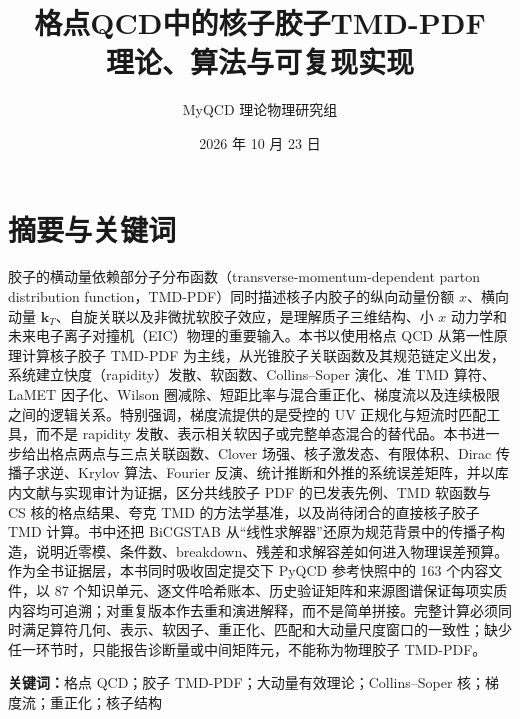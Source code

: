 \documentclass[UTF8,12pt,a4paper,twoside,openany]{ctexbook}
\title{\heiti 格点QCD中的核子胶子TMD-PDF\\[0.2em]\Large 理论、算法与可复现实现}
\author{MyQCD 理论物理研究组}
\date{2026 年 10 月 23 日}
\newcommand{\kT}{\boldsymbol k_T}
\begin{document}
\frontmatter
\maketitle

\chapter*{摘要与关键词}

\begin{tcolorbox}[
  enhanced,
  breakable,
  colback=white,
  colframe=qcdnavy!46!black,
  colbacktitle=qcdnavy!90!black,
  coltitle=white,
  title={摘要 | Abstract},
  boxrule=0.7pt,
  arc=1.8mm,
  left=9pt,
  right=9pt,
  top=7pt,
  bottom=7pt,
  fonttitle=\bfseries
]
\small
\noindent
胶子的横动量依赖部分子分布函数（transverse-momentum-dependent parton distribution function，TMD-PDF）同时描述核子内胶子的纵向动量份额 \(x\)、横向动量 \(\kT\)、自旋关联以及非微扰软胶子效应，是理解质子三维结构、小 \(x\) 动力学和未来电子离子对撞机（EIC）物理的重要输入。本书以使用格点 QCD 从第一性原理计算核子胶子 TMD-PDF 为主线，从光锥胶子关联函数及其规范链定义出发，系统建立快度（rapidity）发散、软函数、Collins--Soper 演化、准 TMD 算符、LaMET 因子化、Wilson 圈减除、短距比率与混合重正化、梯度流以及连续极限之间的逻辑关系。特别强调，梯度流提供的是受控的 UV 正规化与短流时匹配工具，而不是 rapidity 发散、表示相关软因子或完整单态混合的替代品。本书进一步给出格点两点与三点关联函数、Clover 场强、核子激发态、有限体积、Dirac 传播子求逆、Krylov 算法、Fourier 反演、统计推断和外推的系统误差矩阵，并以库内文献与实现审计为证据，区分共线胶子 PDF 的已发表先例、TMD 软函数与 CS 核的格点结果、夸克 TMD 的方法学基准，以及尚待闭合的直接核子胶子 TMD 计算。书中还把 BiCGSTAB 从“线性求解器”还原为规范背景中的传播子构造，说明近零模、条件数、breakdown、残差和求解容差如何进入物理误差预算。作为全书证据层，本书同时吸收固定提交下 PyQCD 参考快照中的 163 个内容文件，以 87 个知识单元、逐文件哈希账本、历史验证矩阵和来源图谱保证每项实质内容均可追溯；对重复版本作去重和演进解释，而不是简单拼接。完整计算必须同时满足算符几何、表示、软因子、重正化、匹配和大动量尺度窗口的一致性；缺少任一环节时，只能报告诊断量或中间矩阵元，不能称为物理胶子 TMD-PDF。

\vspace{0.7em}
\noindent\textbf{关键词：}格点 QCD；胶子 TMD-PDF；大动量有效理论；Collins--Soper 核；梯度流；重正化；核子结构


\end{tcolorbox}
\end{document}
